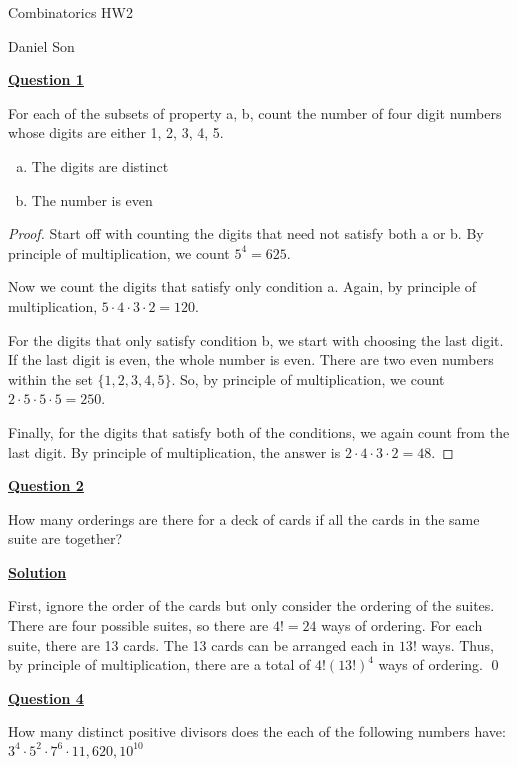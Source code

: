 \documentclass{article}
\newcommand{\new}[1]{
    \vspace{2mm}
    \noindent
    \textbf{
    \underline{#1}}
}
\begin{document}
\begin{center}
\LARGE
Combinatorics HW2

\Large
Daniel Son
\end{center}



\new{Question 1}
For each of the subsets of property a, b, count the number of four
 digit numbers whose digits are either 1, 2, 3, 4, 5. 

 \begin{enumerate}[a)]
    \item The digits are distinct 
    \item The number is even
\end {enumerate}

\begin{proof}
    Start off with counting the digits that need not satisfy both 
    a or b. By principle of multiplication, we count $5^4 = \boxed{625}$. 
    
    Now we count the digits that satisfy only condition a. Again, 
    by principle of multiplication, $5\cdot4\cdot3\cdot2 = \boxed{120}$. 

    For the digits that only satisfy condition b, we start with choosing 
    the last digit. If the last digit is even, the whole number is even. 
    There are two even numbers within the set $\{1, 2, 3, 4, 5\}$. So, 
    by principle of multiplication, we count $2\cdot5\cdot5\cdot5 = \boxed{250}$.
    
    Finally, for the digits that satisfy both of the conditions, 
    we again count from the last digit. By principle of multiplication, 
    the answer is $2\cdot4\cdot3\cdot2 = \boxed{48}$. 
    
\end{proof}

\new{Question 2} 
How many orderings are there for a deck of cards if all the cards 
in the same suite are together?

\new{Solution}
 First, ignore the order of the cards 
but only consider the ordering of the suites. There are four possible suites, 
so there are $4! = 24$ ways of ordering. For each suite, there are 
13 cards. The 13 cards can be arranged each in $13!$ ways. Thus, by 
principle of multiplication, there are a total of $\boxed{4!(13!)^4}$ ways of 
ordering. \hfill \qed


\new{Question 4} 
How many distinct positive divisors does the each of the following numbers have:
$3^4\cdot5^2\cdot7^6\cdot11, 620, 10^{10}$
\end{document}
